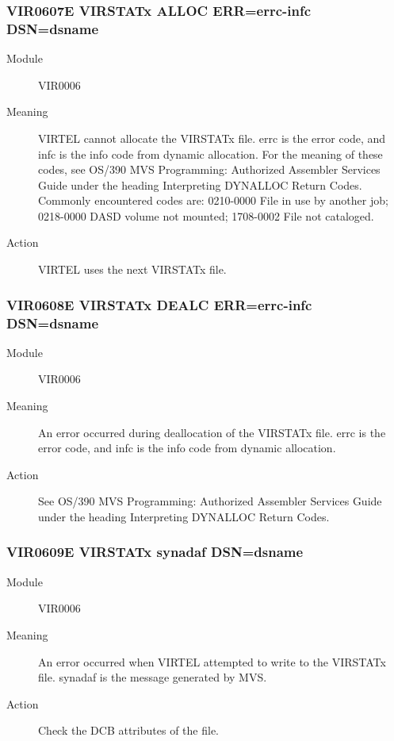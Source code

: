 \documentclass[letterpaper,10pt,english]{sphinxmanual}
\begin{document}
\subsubsection{VIR0607E VIRSTATx ALLOC ERR=errc-infc DSN=dsname}
\label{\detokenize{messages:vir0607e-virstatx-alloc-err-errc-infc-dsn-dsname}}\begin{description}
\item[{Module}] \leavevmode
VIR0006

\item[{Meaning}] \leavevmode
VIRTEL cannot allocate the VIRSTATx file. errc is the error code, and infc is the info code from dynamic allocation.  For the meaning of these codes, see OS/390 MVS Programming: Authorized Assembler Services Guide under the heading Interpreting DYNALLOC Return Codes. Commonly encountered codes are: 0210-0000 File in use by another job; 0218-0000 DASD volume not mounted; 1708-0002 File not cataloged.

\item[{Action}] \leavevmode
VIRTEL uses the next VIRSTATx file.

\end{description}


\subsubsection{VIR0608E VIRSTATx DEALC ERR=errc-infc DSN=dsname}
\label{\detokenize{messages:vir0608e-virstatx-dealc-err-errc-infc-dsn-dsname}}\begin{description}
\item[{Module}] \leavevmode
VIR0006

\item[{Meaning}] \leavevmode
An error occurred during deallocation of the VIRSTATx file. errc is the error code, and infc is the info code from dynamic allocation.

\item[{Action}] \leavevmode
See OS/390 MVS Programming: Authorized Assembler Services Guide under the heading Interpreting DYNALLOC Return Codes.

\end{description}


\subsubsection{VIR0609E VIRSTATx synadaf DSN=dsname}
\label{\detokenize{messages:vir0609e-virstatx-synadaf-dsn-dsname}}\begin{description}
\item[{Module}] \leavevmode
VIR0006

\item[{Meaning}] \leavevmode
An error occurred when VIRTEL attempted to write to the VIRSTATx file. synadaf is the message generated by MVS.

\item[{Action}] \leavevmode
Check the DCB attributes of the file.

\end{description}
\end{document}

